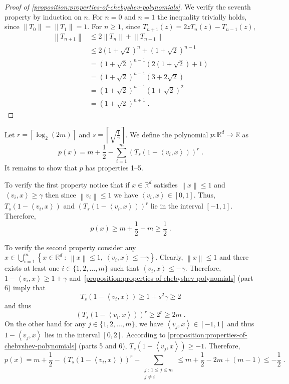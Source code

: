 \documentclass[12pt]{article}
\newcommand{\R}{\mathbb{R}}  %
\newcommand{\ip}[2]{\left\langle #1, #2 \right\rangle} %
\newcommand{\norm}[1]{\left\| #1 \right\|}  %
\begin{document}
\begin{proof}[Proof of \autoref{proposition:properties-of-chebyshev-polynomials}]
We verify the seventh property by induction on $n$.
For $n=0$ and $n=1$ the inequality trivially holds, since $\norm{T_0} = \norm{T_1} = 1$.
For $n \ge 1$, since $T_{n+1}(z) = 2zT_n(z) - T_{n-1}(z)$,
\begin{align*}
\norm{T_{n+1}}
& \le 2 \norm{T_n} + \norm{T_{n-1}} \\
& \le 2 (1 + \sqrt{2})^n + (1 + \sqrt{2})^{n-1} \\
& = (1 + \sqrt{2})^{n-1} (2 (1 + \sqrt{2}) + 1) \\
& = (1 + \sqrt{2})^{n-1} (3 + 2\sqrt{2}) \\
& = (1 + \sqrt{2})^{n-1} (1 + \sqrt{2})^2 \\
& = (1 + \sqrt{2})^{n+1} \; .
\end{align*}

\end{proof}

Let $r = \left\lceil \log_2(2m) \right\rceil$ and $s = \left\lceil \sqrt{\frac{1}{\gamma}} \right\rceil$.
We define the polynomial $p:\R^d \to \R$ as
$$
p(x) = m + \frac{1}{2} - \sum_{i=1}^m \left( T_s(1 - \ip{v_i}{x}) \right)^r \; .
$$
It remains to show that $p$ has properties 1--5.

To verify the first property notice that if $x \in \R^d$ satisfies $\norm{x} \le
1$ and $\ip{v_i}{x} \ge \gamma$ then since $\norm{v_i} \le 1$ we have
$\ip{v_i}{x} \in [0,1]$. Thus, $T_s(1 - \ip{v_i}{x})$ and $\left( T_s(1 -
\ip{v_i}{x}) \right)^r$ lie in the interval $[-1,1]$. Therefore,
$$
p(x) \ge m + \frac{1}{2} - m \ge \frac{1}{2} \; .
$$

To verify the second property consider any $x \in \bigcup_{i=1}^m \left\{ x \in \R^d
~:~ \norm{x} \le 1, \ \ip{v_i}{x} \le - \gamma \right\}$. Clearly, $\norm{x} \le 1$
and there exists at least one $i \in \{1,2,\dots,m\}$ such that $\ip{v_i}{x} \le
- \gamma$. Therefore, $1 - \ip{v_i}{x} \ge 1 + \gamma$ and~\autoref{proposition:properties-of-chebyshev-polynomials} (part 6)
imply that
$$
T_s(1 - \ip{v_i}{x}) \ge 1 + s^2 \gamma \ge 2
$$
and thus
$$
\left( T_s(1 - \ip{v_i}{x}) \right)^r \ge 2^r \ge 2m \; .
$$
On the other hand for any $j \in \{1,2,\dots,m\}$, we have $\ip{v_j}{x} \in
[-1,1]$ and thus $1 - \ip{v_j}{x}$ lies in the interval $[0,2]$. According to
\autoref{proposition:properties-of-chebyshev-polynomials} (parts 5 and 6), $T_s(1 - \ip{v_j}{x})
\ge -1$. Therefore,
$$
p(x) = m + \frac{1}{2} - \left( T_s(1 - \ip{v_i}{x}) \right)^r - \sum_{\substack{j ~:~  1 \le j \le m \\ j \neq i}} \le m + \frac{1}{2} - 2m + (m - 1) \le - \frac{1}{2} \; .
$$
\end{document}
